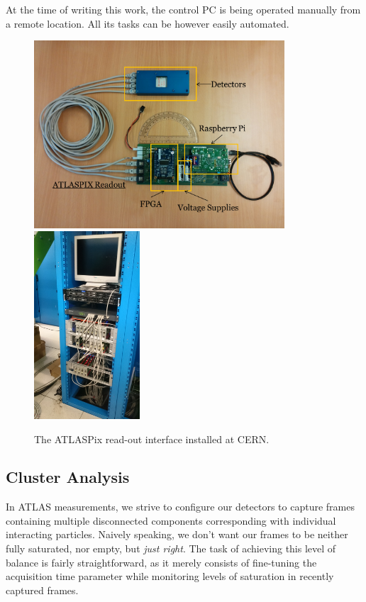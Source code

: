 At the time of writing this work, the control PC is being operated manually from a remote location. All its tasks can be however easily automated.

\begin{figure}[t]
\begin{center}
\includegraphics[height=7cm]{figures/imported/atlaspix}
\includegraphics[height=7cm]{figures/imported/atlaspix-installed}
\caption{The ATLASPix read-out interface installed at CERN.}
\label{fig:ATLASPIX}
\end{center}
\end{figure}


\subsection{Cluster Analysis}
In ATLAS measurements, we strive to configure our detectors to capture frames containing multiple disconnected components corresponding with individual interacting particles. Naively speaking, we don't want our frames to be neither fully saturated, nor empty, but \textit{just right}. The task of achieving this level of balance is fairly straightforward, as it merely consists of fine-tuning the acquisition time parameter while monitoring levels of saturation in recently captured frames.

